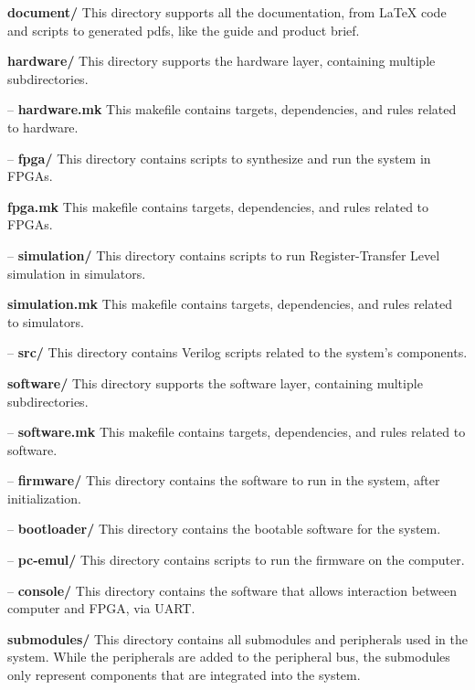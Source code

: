 \textbf{document/} This directory supports all the documentation, from LaTeX code and scripts to generated pdfs, like the guide and product brief.

\textbf{hardware/} This directory supports the hardware layer, containing multiple subdirectories.

\hspace{0.5cm} – \textbf{hardware.mk} This makefile contains targets, dependencies, and rules related to hardware.

\hspace{0.5cm} – \textbf{fpga/} This directory contains scripts to synthesize and run the system in FPGAs.

\hspace{1.2cm}\textbf{fpga.mk} This makefile contains targets, dependencies, and rules related to FPGAs.

\hspace{0.5cm} – \textbf{simulation/} This directory contains scripts to run Register-Transfer Level simulation in simulators.

\hspace{1.2cm}\textbf{simulation.mk} This makefile contains targets, dependencies, and rules related to simulators.

\hspace{0.5cm}– \textbf{src/} This directory contains Verilog scripts related to the system’s components.

\textbf{software/} This directory supports the software layer, containing multiple subdirectories.

\hspace{0.5cm}– \textbf{software.mk} This makefile contains targets, dependencies, and rules related to software.

\hspace{0.5cm}– \textbf{firmware/} This directory contains the software to run in the system, after initialization.

\hspace{0.5cm}– \textbf{bootloader/} This directory contains the bootable software for the system.

\hspace{0.5cm}– \textbf{pc-emul/} This directory contains scripts to run the firmware on the computer.

\hspace{0.5cm}– \textbf{console/} This directory contains the software that allows interaction between computer and FPGA, via UART.

\textbf{submodules/} This directory contains all submodules and peripherals used in the system. While the peripherals are added to the peripheral bus, the submodules only represent components that are integrated into the system. 

